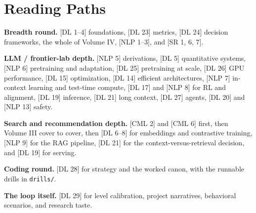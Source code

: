 \section*{Reading Paths}

\textbf{Breadth round.} [DL 1--4] foundations, [DL 23] metrics, [DL 24] decision frameworks, the whole of Volume IV, [NLP 1--3], and [SR 1, 6, 7].

\textbf{LLM / frontier-lab depth.} [NLP 5] derivations, [DL 5] quantitative systems, [NLP 6] pretraining and adaptation, [DL 25] pretraining at scale, [DL 26] GPU performance, [DL 15] optimization, [DL 14] efficient architectures, [NLP 7] in-context learning and test-time compute, [DL 17] and [NLP 8] for RL and alignment, [DL 19] inference, [DL 21] long context, [DL 27] agents, [DL 20] and [NLP 13] safety.

\textbf{Search and recommendation depth.} [CML 2] and [CML 6] first, then Volume III cover to cover, then [DL 6--8] for embeddings and contrastive training, [NLP 9] for the RAG pipeline, [DL 21] for the context-versus-retrieval decision, and [DL 19] for serving.

\textbf{Coding round.} [DL 28] for strategy and the worked canon, with the runnable drills in \texttt{drills/}.

\textbf{The loop itself.} [DL 29] for level calibration, project narratives, behavioral scenarios, and research taste.
